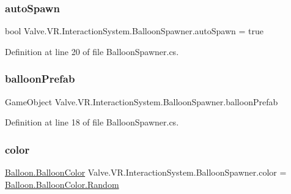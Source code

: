 \subsubsection{\texorpdfstring{autoSpawn}{autoSpawn}}
{\footnotesize\ttfamily bool Valve.\+V\+R.\+Interaction\+System.\+Balloon\+Spawner.\+auto\+Spawn = true}



Definition at line 20 of file Balloon\+Spawner.\+cs.

\mbox{\label{class_valve_1_1_v_r_1_1_interaction_system_1_1_balloon_spawner_a61c487144e94b68e0fc89e0e0a75c0b4}} 
\subsubsection{\texorpdfstring{balloonPrefab}{balloonPrefab}}
{\footnotesize\ttfamily Game\+Object Valve.\+V\+R.\+Interaction\+System.\+Balloon\+Spawner.\+balloon\+Prefab}



Definition at line 18 of file Balloon\+Spawner.\+cs.

\mbox{\label{class_valve_1_1_v_r_1_1_interaction_system_1_1_balloon_spawner_a14a4ee7bbbfe9c8d11c802fee3a8fb89}} 
\subsubsection{\texorpdfstring{color}{color}}
{\footnotesize\ttfamily \mbox{\hyperlink{class_valve_1_1_v_r_1_1_interaction_system_1_1_balloon_afa934082ca64404919e75be87f823175}{Balloon.\+Balloon\+Color}} Valve.\+V\+R.\+Interaction\+System.\+Balloon\+Spawner.\+color = \mbox{\hyperlink{class_valve_1_1_v_r_1_1_interaction_system_1_1_balloon_afa934082ca64404919e75be87f823175a64663f4646781c9c0110838b905daa23}{Balloon.\+Balloon\+Color.\+Random}}}



